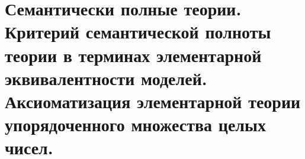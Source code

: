 \section{Семантически полные теории. Критерий семантической полноты теории в терминах элементарной эквивалентности моделей. Аксиоматизация элементарной теории упорядоченного множества целых чисел.}